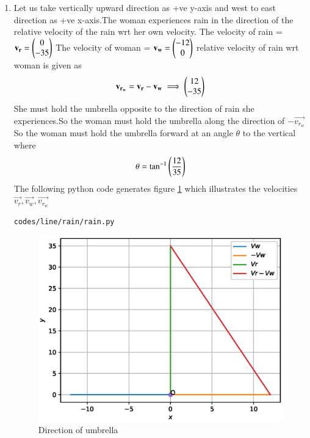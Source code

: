 \renewcommand{\theequation}{\theenumi}
\begin{enumerate}[label=\thesection.\arabic*.,ref=\thesection.\theenumi]

\item Let us take vertically upward direction as +ve y-axis and west to east direction as +ve x-axis.The woman experiences rain in the direction of the relative velocity of the rain wrt her own velocity.
The velocity of rain = $\mathbf{v_r} = \begin{pmatrix}0\\-35\end{pmatrix}$
\newline
The velocity of woman = $\mathbf{v_w} = \begin{pmatrix}-12\\0\end{pmatrix}$
\newline
relative velocity of rain wrt woman is given as
\begin{align}
\mathbf{v_{r_w}} =\mathbf{v_r}- \mathbf{v_w}
\implies \begin{pmatrix}12\\-35\end{pmatrix}
\end{align}
She must hold the umbrella opposite to the direction of rain she experiences.So the woman must hold the umbrella along the direction of $-\vec{v_{r_w}}$
So the woman must hold the umbrella forward at an angle $\theta$ to the vertical where
\begin{align}
\theta={\tan}^{-1}\left(\frac{12}{35}\right)
\end{align}
The following python code generates figure \ref{fig:rain} which illustrates the velocities $\vec{v_r},\vec{v_w},\vec{v_{r_w}}$
%
\begin{lstlisting}
codes/line/rain/rain.py
\end{lstlisting}
\begin{figure}[!ht]
\centering
\includegraphics[width=\columnwidth]{./codes/line/rain/pyfigs/rain.eps}
\caption{Direction of umbrella}
\label{fig:rain}
\end{figure}
\end{enumerate}
